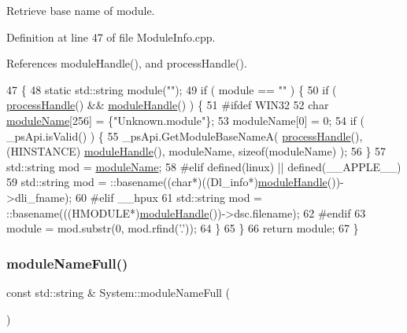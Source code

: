 Retrieve base name of module. 

Definition at line 47 of file Module\+Info.\+cpp.



References module\+Handle(), and process\+Handle().


\begin{DoxyCode}
47                                       \{
48   \textcolor{keyword}{static} std::string module(\textcolor{stringliteral}{""});
49   \textcolor{keywordflow}{if} ( module == \textcolor{stringliteral}{""} )   \{
50     \textcolor{keywordflow}{if} ( \hyperlink{namespaceSystem_a563f947d4a2921f4348ff4f8e909a9f2}{processHandle}() && \hyperlink{namespaceSystem_ab88d0de1d6850b6f95522e9c242eeab0}{moduleHandle}() )    \{
51 \textcolor{preprocessor}{#ifdef WIN32}
52       \textcolor{keywordtype}{char} \hyperlink{namespaceSystem_add155d288552032434ee9e25d130ad72}{moduleName}[256] = \{\textcolor{stringliteral}{"Unknown.module"}\};
53       moduleName[0] = 0;
54       \textcolor{keywordflow}{if} ( \_psApi.isValid() )   \{
55         \_psApi.GetModuleBaseNameA( \hyperlink{namespaceSystem_a563f947d4a2921f4348ff4f8e909a9f2}{processHandle}(), (HINSTANCE)
      \hyperlink{namespaceSystem_ab88d0de1d6850b6f95522e9c242eeab0}{moduleHandle}(), moduleName, \textcolor{keyword}{sizeof}(moduleName) );
56       \}
57       std::string mod = \hyperlink{namespaceSystem_add155d288552032434ee9e25d130ad72}{moduleName};
58 \textcolor{preprocessor}{#elif defined(linux) || defined(\_\_APPLE\_\_)}
59       std::string mod = ::basename((\textcolor{keywordtype}{char}*)((Dl\_info*)\hyperlink{namespaceSystem_ab88d0de1d6850b6f95522e9c242eeab0}{moduleHandle}())->dli\_fname);
60 \textcolor{preprocessor}{#elif \_\_hpux}
61       std::string mod = ::basename(((HMODULE*)\hyperlink{namespaceSystem_ab88d0de1d6850b6f95522e9c242eeab0}{moduleHandle}())->dsc.filename);
62 \textcolor{preprocessor}{#endif}
63       module = mod.substr(0, mod.rfind(\textcolor{charliteral}{'.'}));
64     \}
65   \}
66   \textcolor{keywordflow}{return} module;
67 \} 
\end{DoxyCode}
\mbox{\label{namespaceSystem_abbb9e2ab2f883bfe24805d89bef43792}} 
\subsubsection{\texorpdfstring{module\+Name\+Full()}{moduleNameFull()}}
{\footnotesize\ttfamily const std\+::string \& System\+::module\+Name\+Full (\begin{DoxyParamCaption}{ }\end{DoxyParamCaption})}



